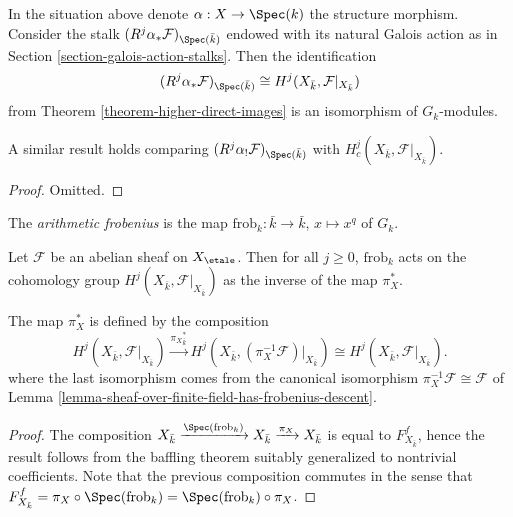 \begin{lemma}
\label{lemma-two-actions-agree}
In the situation above denote $\alpha : X \to \Spec(k)$ the structure morphism.
Consider the stalk $(R^j\alpha_*\mathcal{F})_{\Spec(\bar k)}$ endowed with its
natural Galois action as in Section \ref{section-galois-action-stalks}. Then
the identification
$$
(R^j\alpha_*\mathcal{F})_{\Spec(\bar k)} \cong H^j (X_{\bar k},
\mathcal{F}|_{X_{\bar k}})
$$
from Theorem \ref{theorem-higher-direct-images} is an isomorphism of
$G_k$-modules.
\end{lemma}

\noindent
A similar result holds comparing
$(R^j\alpha_!\mathcal{F})_{\Spec(\bar k)}$ with
$H^j_c (X_{\bar k}, \mathcal{F}|_{X_{\bar k}})$.

\begin{proof}
Omitted.
\end{proof}

\begin{definition}
\label{definition-arithmetic-frobenius}
The {\it arithmetic frobenius} is the map
$\text{frob}_k : \bar k \to \bar k$, $x \mapsto x^q$ of $G_k$.
\end{definition}

\begin{theorem}
\label{theorem-geometric-arithmetic-inverse}
Let $\mathcal{F}$ be an abelian sheaf on $X_\etale$. Then for all
$j\geq 0$, $\text{frob}_k$ acts on the cohomology group $H^j(X_{\bar k},
\mathcal{F}|_{X_{\bar k}})$ as the inverse of the map $\pi_X^*$.
\end{theorem}

\noindent
The map $\pi_X^*$ is defined by the composition
$$
H^j(X_{\bar k}, \mathcal{F}|_{X_{\bar k}}) \xrightarrow{{\pi_X}_{\bar k}^*}
H^j(X_{\bar k}, (\pi_X^{-1} \mathcal{F})|_{X_{\bar k}}) \cong
H^j(X_{\bar k}, \mathcal{F}|_{X_{\bar k}}).
$$
where the last isomorphism comes from the canonical isomorphism
$\pi_X^{-1} \mathcal{F} \cong \mathcal{F}$ of
Lemma \ref{lemma-sheaf-over-finite-field-has-frobenius-descent}.

\begin{proof}
The composition $X_{\bar k} \xrightarrow{\Spec(\text{frob}_k)} X_{\bar k}
\xrightarrow{\pi_X} X_{\bar k}$ is equal to $F_{X_{\bar k}}^f$, hence the
result follows from the baffling theorem suitably generalized to nontrivial
coefficients. Note that the previous composition commutes in the sense that
$F_{X_{\bar k}}^f = \pi_X \circ \Spec(\text{frob}_k) =
\Spec(\text{frob}_k) \circ \pi_X$.
\end{proof}

